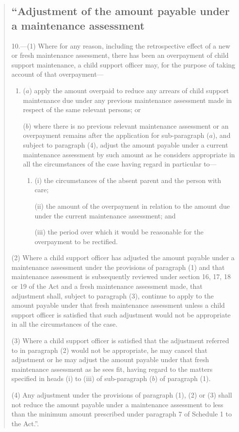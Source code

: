 \documentclass[a4paper]{article}
\begin{document}
\begin{quotation}
\subsection*{“Adjustment of the amount payable under a maintenance assessment}

10.—(1) Where for any reason, including the retrospective effect of a new or fresh maintenance assessment, there has been an overpayment of child support maintenance, a child support officer may, for the purpose of taking account of that overpayment—
\begin{enumerate}\item[]
($a$) apply the amount overpaid to reduce any arrears of child support maintenance due under any previous maintenance assessment made in respect of the same relevant persons; or

($b$) where there is no previous relevant maintenance assessment or an overpayment remains after the application for sub-paragraph ($a$), and subject to paragraph (4), adjust the amount payable under a current maintenance assessment by such amount as he considers appropriate in all the circumstances of the case having regard in particular to—
\begin{enumerate}\item[]
(i) the circumstances of the absent parent and the person with care;

\begin{sloppypar}
(ii) the amount of the overpayment in relation to the amount due under the current maintenance assessment; and
\end{sloppypar}

(iii) the period over which it would be reasonable for the overpayment to be rectified.
\end{enumerate}
\end{enumerate}

\begin{sloppypar}
(2) Where a child support officer has adjusted the amount payable under a maintenance assessment under the provisions of paragraph (1) and that maintenance assessment is subsequently reviewed under section 16, 17, 18 or 19 of the Act and a fresh maintenance assessment made, that adjustment shall, subject to paragraph (3), continue to apply to the amount payable under that fresh maintenance assessment unless a child support officer is satisfied that such adjustment would not be appropriate in all the circumstances of the case.
\end{sloppypar}

(3) Where a child support officer is satisfied that the adjustment referred to in paragraph (2) would not be appropriate, he may cancel that adjustment or he may adjust the amount payable under that fresh maintenance assessment as he sees fit, having regard to the matters specified in heads (i) to (iii) of sub-paragraph ($b$) of paragraph (1).

(4) Any adjustment under the provisions of paragraph (1), (2) or (3) shall not reduce the amount payable under a maintenance assessment to less than the minimum amount prescribed under paragraph 7 of Schedule 1 to the Act.”.
\end{quotation}
\end{document}
